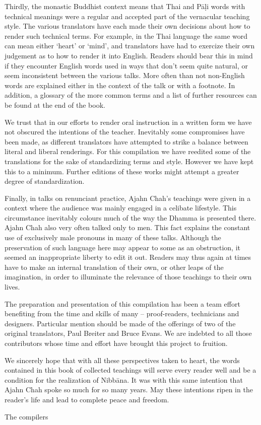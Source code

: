 Thirdly, the monastic Buddhist context means that Thai and P\=a\d{l}i words with technical meanings were a regular and accepted part of the vernacular teaching style. The various translators have each made their own decisions about how to render such technical terms. For example, in the Thai language the same word can mean either `heart' or `mind', and translators have had to exercize their own judgement as to how to render it into English. Readers should bear this in mind if they encounter English words used in ways that don't seem quite natural, or seem inconsistent between the various talks. More often than not non-English words are explained either in the context of the talk or with a footnote. In addition, a glossary of the more common terms and a list of further resources can be found at the end of the book.

We trust that in our efforts to render oral instruction in a written form we have not obscured the intentions of the teacher. Inevitably some compromises have been made, as different translators have attempted to strike a balance between literal and liberal renderings. For this compilation we have reedited some of the translations for the sake of standardizing terms and style. However we have kept this to a minimum. Further editions of these works might attempt a greater degree of standardization. 

Finally, in talks on renunciant practice, Ajahn Chah's teachings were given in a context where the audience was mainly engaged in a celibate lifestyle. This circumstance inevitably colours much of the way the Dhamma is presented there. Ajahn Chah also very often talked only to men. This fact explains the constant use of exclusively male pronouns in many of these talks. Although the preservation of such language here may appear to some as an obstruction, it seemed an inappropriate liberty to edit it out. Readers may thus again at times have to make an internal translation of their own, or other leaps of the imagination, in order to illuminate the relevance of those teachings to their own lives. 

The preparation and presentation of this compilation has been a team effort benefiting from the time and skills of many -- proof-readers, technicians and designers. Particular mention should be made of the offerings of two of the original translators, Paul Breiter and Bruce Evans. We are indebted to all those contributors whose time and effort have brought this project to fruition.

We sincerely hope that with all these perspectives taken to heart, the words contained in this book of collected teachings will serve every reader well and be a condition for the realization of Nibb\=ana. It was with this same intention that Ajahn Chah spoke so much for so many years. May these intentions ripen in the reader's life and lead to complete peace and freedom.
\bigskip

{\raggedleft\par The compilers\par}


